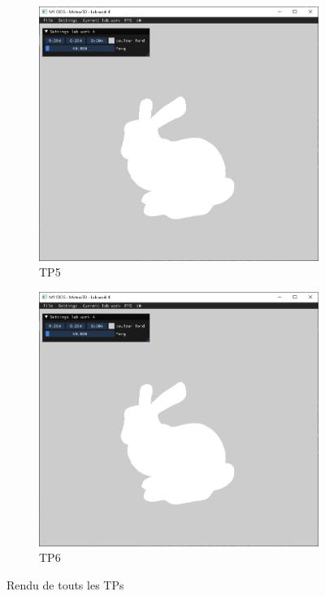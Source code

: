 \documentclass[10pt,a4paper]{article}
\begin{document}
\begin{figure}[!ht]
\begin{subfigure}[b]{0.32\textwidth}
				\centering
				\includegraphics[width=.9\textwidth]{figures/TP5.png}
				\caption{TP5}\label{fig:TP5}
			\end{subfigure}
			\hfill
			\begin{subfigure}[b]{0.32\textwidth}
				\centering
				\includegraphics[width=.9\textwidth]{figures/TP6.png}
				\caption{TP6}\label{fig:TP6}
			\end{subfigure}
			\caption{Rendu de touts les TPs}\label{fig:TPs}
		\end{figure}
\end{document}
